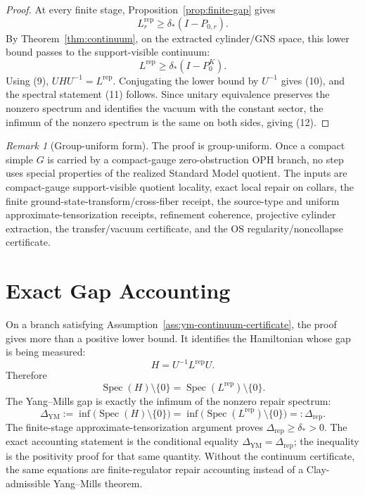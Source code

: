 \documentclass[11pt]{article}
\numberwithin{equation}{section}
\theoremstyle{remark}
\newtheorem{remark}[theorem]{Remark}
\newcommand{\YM}{\mathrm{YM}}
\newcommand{\Rep}{\mathrm{rep}}
\begin{document}
\begin{proof}
At every finite stage, Proposition~\ref{prop:finite-gap} gives
\[
L_r^{\Rep}\ge \delta_*(I-P_{0,r}).
\]
By Theorem~\ref{thm:continuum}, on the extracted cylinder/GNS space, this lower bound passes to
the support-visible continuum:
\[
L^{\mathrm{rep}}\ge \delta_*(I-P_0^K).
\]
Using (9), \(UHU^{-1}=L^{\mathrm{rep}}\). Conjugating the lower bound by \(U^{-1}\) gives (10),
and the spectral statement (11) follows. Since unitary equivalence preserves the nonzero spectrum
and identifies the vacuum with the constant sector, the infimum of the nonzero spectrum is the
same on both sides, giving (12).
\end{proof}

\begin{remark}[Group-uniform form]
The proof is group-uniform. Once a compact simple \(G\) is carried by a compact-gauge
zero-obstruction OPH branch, no step uses special properties of the realized Standard Model
quotient. The inputs are compact-gauge support-visible quotient locality, exact local repair on
collars, the finite ground-state-transform/cross-fiber receipt, the source-type and uniform
approximate-tensorization receipts, refinement coherence, projective cylinder extraction, the transfer/vacuum certificate,
and the OS regularity/noncollapse certificate.
\end{remark}

\section{Exact Gap Accounting}

On a branch satisfying Assumption~\ref{ass:ym-continuum-certificate}, the proof gives more than a
positive lower bound. It identifies the Hamiltonian whose gap is being measured:
\[
H=U^{-1}L^{\mathrm{rep}}U.
\]
Therefore
\[
\operatorname{Spec}(H)\setminus\{0\}
=
\operatorname{Spec}(L^{\mathrm{rep}})\setminus\{0\}.
\]
The Yang--Mills gap is exactly the infimum of the nonzero repair spectrum:
\[
\Delta_{\YM}
:=
\inf\bigl(\operatorname{Spec}(H)\setminus\{0\}\bigr)
=
\inf\bigl(\operatorname{Spec}(L^{\mathrm{rep}})\setminus\{0\}\bigr)
=:
\Delta_{\mathrm{rep}}.
\]
The finite-stage approximate-tensorization argument proves \(\Delta_{\mathrm{rep}}\ge\delta_*>0\). The exact accounting
statement is the conditional equality \(\Delta_{\YM}=\Delta_{\mathrm{rep}}\); the inequality is the
positivity proof for that same quantity. Without the continuum certificate, the same equations
are finite-regulator repair accounting instead of a Clay-admissible Yang--Mills theorem.
\end{document}
